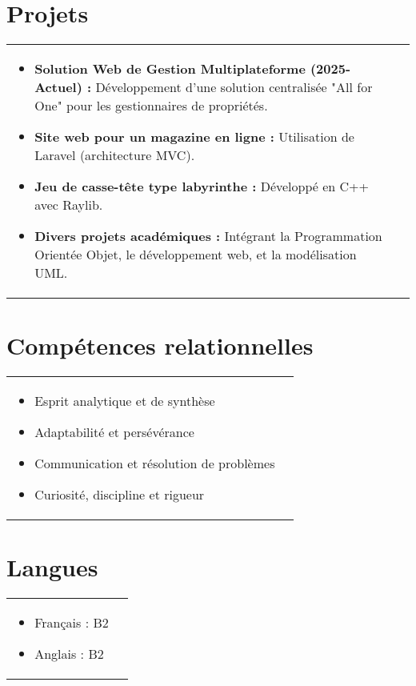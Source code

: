 \documentclass[a4paper,8pt]{article}
\begin{document}
\section{Projets}
\begin{tabularx}{\linewidth}{ @{}l r@{} }
\begin{minipage}[t]{\linewidth}
    \begin{itemize}[nosep,after=\strut, leftmargin=2em, itemsep=2pt]
        \item \textbf{Solution Web de Gestion Multiplateforme (2025-Actuel) :} Développement d'une solution centralisée "All for One" pour les gestionnaires de propriétés.
        \item \textbf{Site web pour un magazine en ligne :} Utilisation de Laravel (architecture MVC).
        \item \textbf{Jeu de casse-tête type labyrinthe :} Développé en C++ avec Raylib.
        \item \textbf{Divers projets académiques :} Intégrant la Programmation Orientée Objet, le développement web, et la modélisation UML.
    \end{itemize}
\end{minipage}
\end{tabularx}

\section{Compétences relationnelles}
\begin{tabularx}{\linewidth}{ @{}l r@{} }
\begin{minipage}[t]{\linewidth}
    \begin{itemize}[nosep,after=\strut, leftmargin=2em, itemsep=2pt]
        \item Esprit analytique et de synthèse
        \item Adaptabilité et persévérance
        \item Communication et résolution de problèmes
        \item Curiosité, discipline et rigueur
    \end{itemize}
\end{minipage}
\end{tabularx}

\section{Langues}
\begin{tabularx}{\linewidth}{ @{}l r@{} }
\begin{minipage}[t]{\linewidth}
    \begin{itemize}[nosep,after=\strut, leftmargin=2em, itemsep=2pt]
        \item Français : B2
        \item Anglais : B2
    \end{itemize}
\end{minipage}
\end{tabularx}
\end{document}
